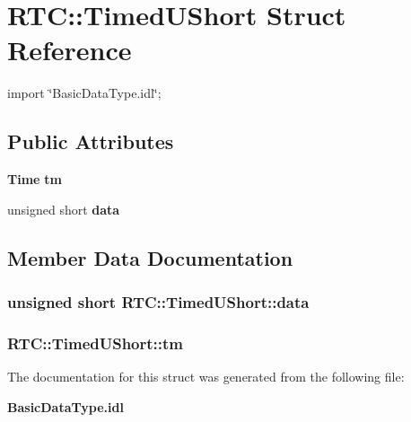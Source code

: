\section{RTC::TimedUShort Struct Reference}
\label{structRTC_1_1TimedUShort}


{\ttfamily import \char`\"{}BasicDataType.idl\char`\"{};}

\subsection*{Public Attributes}
\begin{DoxyCompactItemize}
\item 
{\bf Time} {\bf tm}
\item 
unsigned short {\bf data}
\end{DoxyCompactItemize}


\subsection{Member Data Documentation}
\subsubsection[{data}]{\setlength{\rightskip}{0pt plus 5cm}unsigned short {\bf RTC::TimedUShort::data}}\label{structRTC_1_1TimedUShort_a9a5950e600ec8593c5b5c15f574ed301}
\subsubsection[{tm}]{ {\bf RTC::TimedUShort::tm}}\label{structRTC_1_1TimedUShort_aba42a7a2a97b9c0b2d3cf642539f0690}


The documentation for this struct was generated from the following file:\begin{DoxyCompactItemize}
\item 
{\bf BasicDataType.idl}\end{DoxyCompactItemize}
